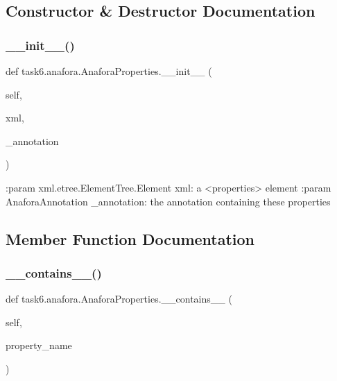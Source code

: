 \subsection{Constructor \& Destructor Documentation}
\mbox{\label{classtask6_1_1anafora_1_1AnaforaProperties_a19b39ede129d2a0dd00232353fad825b}} 
\subsubsection{\texorpdfstring{\+\_\+\+\_\+init\+\_\+\+\_\+()}{\_\_init\_\_()}}
{\footnotesize\ttfamily def task6.\+anafora.\+Anafora\+Properties.\+\_\+\+\_\+init\+\_\+\+\_\+ (\begin{DoxyParamCaption}\item[{}]{self,  }\item[{}]{xml,  }\item[{}]{\+\_\+annotation }\end{DoxyParamCaption})}

\begin{DoxyVerb}:param xml.etree.ElementTree.Element xml: a <properties> element
:param AnaforaAnnotation _annotation: the annotation containing these properties
\end{DoxyVerb}
 

\subsection{Member Function Documentation}
\mbox{\label{classtask6_1_1anafora_1_1AnaforaProperties_a5b8c308aed2c101b4bc5e170558727f2}} 
\subsubsection{\texorpdfstring{\+\_\+\+\_\+contains\+\_\+\+\_\+()}{\_\_contains\_\_()}}
{\footnotesize\ttfamily def task6.\+anafora.\+Anafora\+Properties.\+\_\+\+\_\+contains\+\_\+\+\_\+ (\begin{DoxyParamCaption}\item[{}]{self,  }\item[{}]{property\+\_\+name }\end{DoxyParamCaption})}

